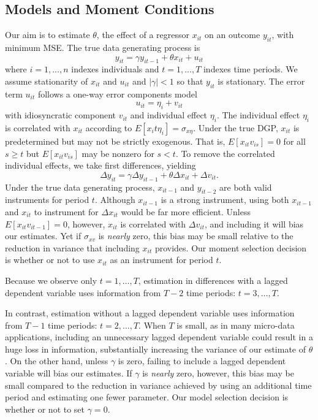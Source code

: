 \subsection{Models and Moment Conditions}
Our aim is to estimate $\theta$, the effect of a regressor $x_{it}$ on an outcome $y_{it}$, with minimum MSE. The true data generating process is 
	\begin{equation}
				y_{it} = \gamma y_{it-1} + \theta x_{it} + u_{it}
	\end{equation}
where $i = 1, \hdots, n$ indexes individuals and $t=1, \hdots, T$  indexes time periods. We assume stationarity of $x_{it}$ and $u_{it}$ and $|\gamma|<1$ so that $y_{it}$ is stationary. The error term $u_{it}$ follows a one-way error components model
	\begin{equation}
				u_{it}= \eta_i + v_{it}
	\end{equation}
with idiosyncratic component $v_{it}$ and individual effect $\eta_i$. 
The individual effect $\eta_i$ is correlated with $x_{it}$ according to $E[x_it \eta_i]= \sigma_{x\eta}$. 
Under the true DGP, $x_{it}$ is predetermined but may not be strictly exogenous. 
That is, $E[x_{it}v_{is}] = 0$ for all $s\geq t$ but $E[x_{it}v_{is}]$ may be nonzero for $s<t$. 
To remove the correlated individual effects, we take first differences, yielding
	\begin{equation}
	\Delta y_{it} = \gamma \Delta y_{it-1} + \theta \Delta x_{it} + \Delta v_{it}.
	\end{equation}
Under the true data generating process, $x_{it-1}$ and $y_{it-2}$ are both valid instruments for period $t$.
Although $x_{it-1}$ is a strong instrument, using both $x_{it-1}$ and $x_{it}$ to instrument for $\Delta x_{it}$ would be far more efficient. 
Unless $E[x_{it}v_{it-1}]=0$, however, $x_{it}$ is correlated with $\Delta v_{it}$, and including it will bias our estimates. 
Yet if $\sigma_{xv}$ is \emph{nearly} zero, this bias may be small relative to the reduction in variance that including $x_{it}$ provides.  
Our moment selection decision is whether or not to use $x_{it}$ as an instrument for period $t$.

Because we observe only $t = 1, \hdots, T$, estimation in differences with a lagged dependent variable uses information from $T-2$ time periods: $t = 3, \hdots, T$.

In contrast, estimation without a lagged dependent variable uses information from $T-1$ time periods: $t=2, \hdots, T$.
When $T$ is small, as in many micro-data applications, including an unnecessary lagged dependent variable could result in a huge loss in information, substantially increasing the variance of our estimate of $\theta$. 
On the other hand, unless $\gamma$ is zero, failing to include a lagged dependent variable will bias our estimates. 
If $\gamma$ is \emph{nearly} zero, however, this bias may be small compared to the reduction in variance achieved by using an additional time period and estimating one fewer parameter. 
Our model selection decision is whether or not to set $\gamma = 0$.  

